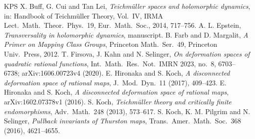 \documentclass[11pt]{article}
\theoremstyle{remark}
\numberwithin{equation}{section}
\begin{document}
\begin{thebibliography}{KPS}
X. Buff, G. Cui and Tan Lei,
\emph{Teichm\"uller spaces and holomorphic dynamics},
in: Handbook of Teichm\"uller Theory, Vol.\ IV, IRMA Lect.\ Math.\ Theor.\
Phys.\ 19, Eur.\ Math.\ Soc., 2014, 717--756.
A. L. Epstein,
\emph{Transversality in holomorphic dynamics},
manuscript.
B. Farb and D. Margalit,
\emph{A Primer on Mapping Class Groups},
Princeton Math.\ Ser.\ 49, Princeton Univ.\ Press, 2012.
T. Firsova, J. Kahn and N. Selinger,
\emph{On deformation spaces of quadratic rational functions},
Int.\ Math.\ Res.\ Not.\ IMRN 2023, no.\ 8, 6703--6738; arXiv:1606.00723v4
(2020).
E. Hironaka and S. Koch,
\emph{A disconnected deformation space of rational maps},
J.\ Mod.\ Dyn.\ 11 (2017), 409--423.
E. Hironaka and S. Koch,
\emph{A disconnected deformation space of rational maps},
arXiv:1602.07378v1 (2016).
S. Koch,
\emph{Teichm\"uller theory and critically finite endomorphisms},
Adv.\ Math.\ 248 (2013), 573--617.
S. Koch, K. M. Pilgrim and N. Selinger,
\emph{Pullback invariants of Thurston maps},
Trans.\ Amer.\ Math.\ Soc.\ 368 (2016), 4621--4655.
\end{thebibliography}
\end{document}
